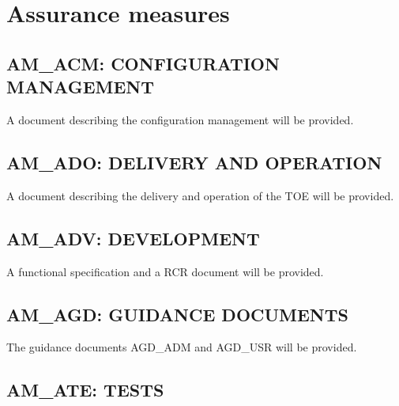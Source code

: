 \documentclass[12pt,english]{scrbook}
\begin{document}


\section{Assurance measures}





\subsection{AM{\_}ACM: CONFIGURATION MANAGEMENT}

A document describing the configuration management will be provided.





\subsection{AM{\_}ADO: DELIVERY AND OPERATION}

A document describing the delivery and operation of the TOE will be provided.





\subsection{AM{\_}ADV: DEVELOPMENT}

A functional specification and a RCR document will be provided.





\subsection{AM{\_}AGD: GUIDANCE DOCUMENTS}

The guidance documents AGD{\_}ADM and AGD{\_}USR will be provided.





\subsection{AM{\_}ATE: TESTS}
\end{document}
